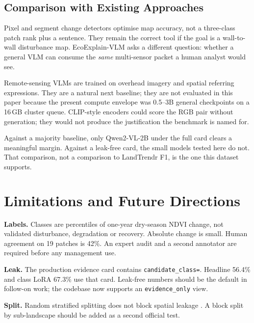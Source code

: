 \documentclass[11pt]{article}
\begin{document}
\subsection{Comparison with Existing Approaches}

Pixel and segment change detectors \citep{hansen2013,kennedy2010,zhu2014,daudt2018}
optimise map accuracy, not a three-class patch rank plus a sentence.
They remain the correct tool if the goal is a wall-to-wall
disturbance map. EcoExplain-VLM asks a different question: whether
a general VLM can consume the \emph{same} multi-sensor packet a
human analyst would see.

Remote-sensing VLMs \citep{kuckreja2024} are trained on overhead
imagery and spatial referring expressions. They are a natural next
baseline; they are not evaluated in this paper because the present
compute envelope was 0.5--3B general checkpoints on a 16\,GB
cluster queue. CLIP-style encoders \citep{radford2021} could score
the RGB pair without generation; they would not produce the
justification the benchmark is named for.

Against a majority baseline, only Qwen2-VL-2B under the full card
clears a meaningful margin. Against a leak-free card, the small
models tested here do not. That comparison, not a comparison to
LandTrendr F1, is the one this dataset supports.


\section{Limitations and Future Directions}

\textbf{Labels.} Classes are percentiles of one-year dry-season NDVI
change, not validated disturbance, degradation or recovery. Absolute
change is small. Human agreement on 19 patches is 42\%. An expert
audit and a second annotator are required before any management use.

\textbf{Leak.} The production evidence card contains
\texttt{candidate\_class=}. Headline 56.4\% and class LoRA 67.3\%
use that card. Leak-free numbers should be the default in follow-on
work; the codebase now supports an \texttt{evidence\_only} view.

\textbf{Split.} Random stratified splitting does not block spatial
leakage \citep{ploton2020}. A block split by sub-landscape should be
added as a second official test.
\end{document}
